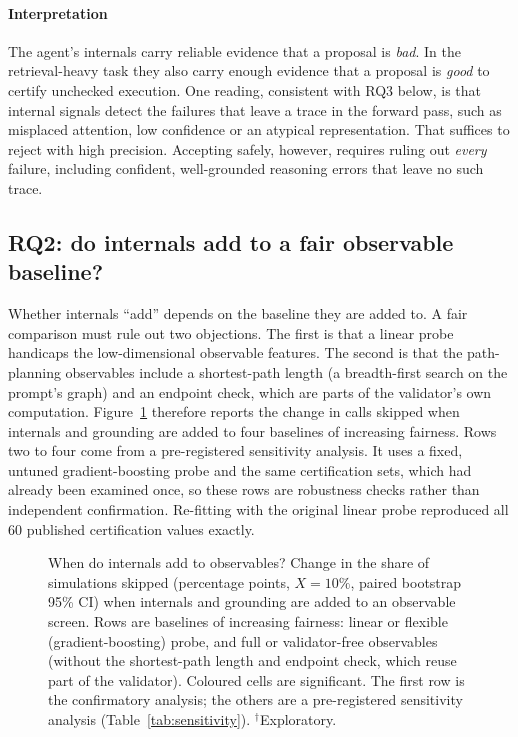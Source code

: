 \paragraph{Interpretation} The agent's internals carry reliable evidence that a proposal is \emph{bad}. In the
retrieval-heavy task they also carry enough evidence that a proposal is \emph{good} to certify unchecked
execution. One reading, consistent with RQ3 below, is that internal signals detect the failures that leave a
trace in the forward pass, such as misplaced attention, low confidence or an atypical representation. That
suffices to reject with high precision. Accepting safely, however, requires ruling out \emph{every} failure,
including confident, well-grounded reasoning errors that leave no such trace.

\subsection{RQ2: do internals add to a fair observable baseline?}\label{sec:res-rq2}


Whether internals ``add'' depends on the baseline they are added to. A fair comparison must rule out two
objections. The first is that a linear probe handicaps the low-dimensional observable features. The second is
that the path-planning observables include a shortest-path length (a breadth-first search on the prompt's graph)
and an endpoint check, which are parts of the validator's own computation. Figure~\ref{fig:heatmap} therefore
reports the change in calls skipped when internals and grounding are added to four baselines of increasing
fairness. Rows two to four come from a pre-registered sensitivity analysis. It uses a fixed, untuned
gradient-boosting probe and the same certification sets, which had already been examined once, so these rows are
robustness checks rather than independent confirmation. Re-fitting with the original linear probe reproduced all
60 published certification values exactly.

\begin{figure}[!htbp]
\centering

\caption{When do internals add to observables? Change in the share of simulations skipped (percentage points,
$X=10\%$, paired bootstrap 95\% CI) when internals and grounding are added to an observable screen. Rows are
baselines of increasing fairness: linear or flexible (gradient-boosting) probe, and full or validator-free
observables (without the shortest-path length and endpoint check, which reuse part of the validator). Coloured
cells are significant. The first row is the confirmatory analysis; the others are a pre-registered sensitivity
analysis (Table~\ref{tab:sensitivity}). $^\dagger$Exploratory.}
\label{fig:heatmap}
\end{figure}

